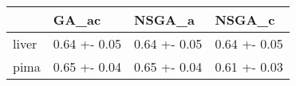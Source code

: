 \begin{tabular}{llll}
\toprule
{} &         GA\_ac &        NSGA\_a &        NSGA\_c \\
\midrule
liver &  0.64 +- 0.05 &  0.64 +- 0.05 &  0.64 +- 0.05 \\
pima  &  0.65 +- 0.04 &  0.65 +- 0.04 &  0.61 +- 0.03 \\
\bottomrule
\end{tabular}
